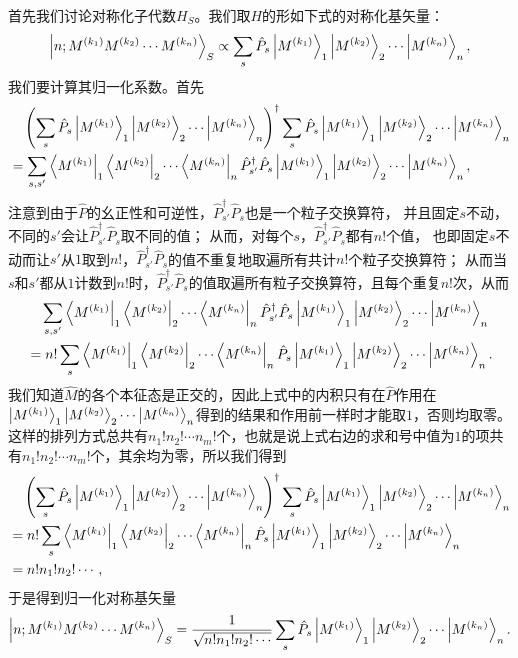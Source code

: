 \documentclass[UTF8, a4paper]{ctexart}
\begin{document}
首先我们讨论对称化子代数$H_S$。我们取$H$的形如下式的对称化基矢量：
\[
    \ket{n; M^{(k_1)} M^{(k_2)} \cdots M^{(k_n)}}_S \propto \sum_s \hat{P}_s \ket{M^{(k_1)}}_1 \ket{M^{(k_2)}}_2 \cdots \ket{M^{(k_n)}}_n,
\]
我们要计算其归一化系数。首先
\[
    \begin{aligned}
        &\quad \left(\sum_s \hat{P}_s \ket{M^{(k_1)}}_1 \ket{M^{(k_2)}}_2 \cdots \ket{M^{(k_n)}}_n\right)^\dagger \sum_s \hat{P}_s \ket{M^{(k_1)}}_1 \ket{M^{(k_2)}}_2 \cdots \ket{M^{(k_n)}}_n \\
        &= \sum_{s, s'} \bra{M^{(k_1)}}_1 \bra{M^{(k_2)}}_2 \cdots \bra{M^{(k_n)}}_n \hat{P}_{s'}^\dagger \hat{P}_s \ket{M^{(k_1)}}_1 \ket{M^{(k_2)}}_2 \cdots \ket{M^{(k_n)}}_n, 
    \end{aligned}
\]
注意到由于$\hat{P}$的幺正性和可逆性，$\hat{P}_{s'}^\dagger \hat{P}_s$也是一个粒子交换算符，
并且固定$s$不动，不同的$s'$会让$\hat{P}_{s'}^\dagger \hat{P}_s$取不同的值；
从而，对每个$s$，$\hat{P}_{s'}^\dagger \hat{P}_s$都有$n!$个值，
也即固定$s$不动而让$s'$从$1$取到$n!$，$\hat{P}_{s'}^\dagger \hat{P}_s$的值不重复地取遍所有共计$n!$个粒子交换算符；
从而当$s$和$s'$都从$1$计数到$n!$时，$\hat{P}_{s'}^\dagger \hat{P}_s$的值取遍所有粒子交换算符，且每个重复$n!$次，从而
\[
    \begin{aligned}
        &\quad \sum_{s, s'} \bra{M^{(k_1)}}_1 \bra{M^{(k_2)}}_2 \cdots \bra{M^{(k_n)}}_n \hat{P}_{s'}^\dagger \hat{P}_s \ket{M^{(k_1)}}_1 \ket{M^{(k_2)}}_2 \cdots \ket{M^{(k_n)}}_n \\
        &= n! \sum_s \bra{M^{(k_1)}}_1 \bra{M^{(k_2)}}_2 \cdots \bra{M^{(k_n)}}_n \hat{P}_s \ket{M^{(k_1)}}_1 \ket{M^{(k_2)}}_2 \cdots \ket{M^{(k_n)}}_n.
    \end{aligned}
\]
我们知道$\hat{M}$的各个本征态是正交的，因此上式中的内积只有在$\hat{P}$作用在$\ket{M^{(k_1)}}_1 \ket{M^{(k_2)}}_2 \cdots \ket{M^{(k_n)}}_n$得到的结果和作用前一样时才能取$1$，否则均取零。这样的排列方式总共有$n_1!n_2!\cdots n_m!$个，也就是说上式右边的求和号中值为$1$的项共有$n_1!n_2!\cdots n_m!$个，其余均为零，所以我们得到
\[
    \begin{aligned}
        &\quad \left(\sum_s \hat{P}_s \ket{M^{(k_1)}}_1 \ket{M^{(k_2)}}_2 \cdots \ket{M^{(k_n)}}_n\right)^\dagger \sum_s \hat{P}_s \ket{M^{(k_1)}}_1 \ket{M^{(k_2)}}_2 \cdots \ket{M^{(k_n)}}_n \\
        &= n! \sum_s \bra{M^{(k_1)}}_1 \bra{M^{(k_2)}}_2 \cdots \bra{M^{(k_n)}}_n \hat{P}_s \ket{M^{(k_1)}}_1 \ket{M^{(k_2)}}_2 \cdots \ket{M^{(k_n)}}_n \\
        &= n! n_1 ! n_2! \cdots ,
    \end{aligned}
\]
于是得到归一化对称基矢量
\begin{equation}
    \ket{n; M^{(k_1)} M^{(k_2)} \cdots M^{(k_n)}}_S = \frac{1}{\sqrt{n! n_1 ! n_2! \cdots}} \sum_s \hat{P}_s \ket{M^{(k_1)}}_1 \ket{M^{(k_2)}}_2 \cdots \ket{M^{(k_n)}}_n.
    \label{eq:sym-basis}
\end{equation}
\end{document}
